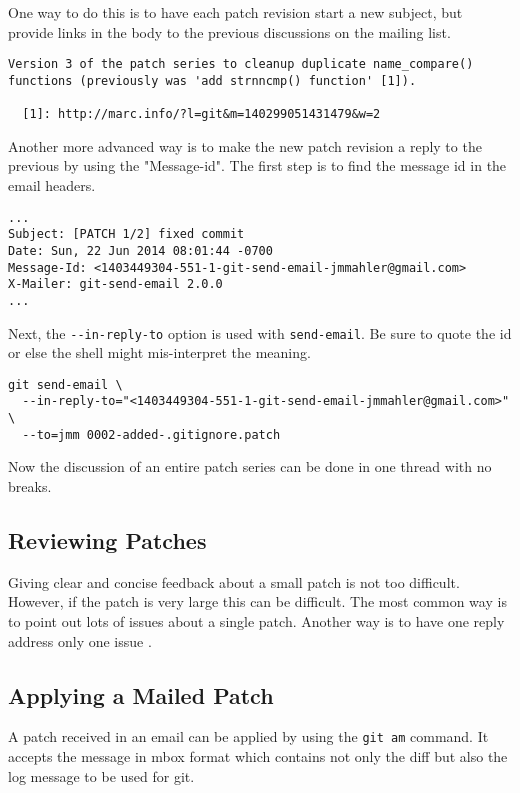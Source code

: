 \documentclass{article}
\begin{document}
One way to do this is to have each patch revision start a new subject,
but provide links in the body to the previous discussions on the mailing list.

\begin{verbatim}
Version 3 of the patch series to cleanup duplicate name_compare()
functions (previously was 'add strnncmp() function' [1]).  
    
  [1]: http://marc.info/?l=git&m=140299051431479&w=2
\end{verbatim}

Another more advanced way is to make the new patch revision a reply to the
previous by using the "Message-id".  The first step is to find the
message id in the email headers.

\begin{verbatim}
...
Subject: [PATCH 1/2] fixed commit
Date: Sun, 22 Jun 2014 08:01:44 -0700
Message-Id: <1403449304-551-1-git-send-email-jmmahler@gmail.com>
X-Mailer: git-send-email 2.0.0
...
\end{verbatim}

Next, the \verb+--in-reply-to+ option is used with \verb+send-email+.  Be sure to
quote the id or else the shell might mis-interpret the meaning.

\begin{verbatim}
git send-email \
  --in-reply-to="<1403449304-551-1-git-send-email-jmmahler@gmail.com>" \
  --to=jmm 0002-added-.gitignore.patch
\end{verbatim}

Now the discussion of an entire patch series can be done in one thread
with no breaks.

\subsection{Reviewing Patches}

Giving clear and concise feedback about a small patch is not too
difficult.  However, if the patch is very large this can be difficult.
The most common way is to point out lots of issues about a single patch.
Another way is to have one reply address only one issue \autocite{onereply}.

\subsection{Applying a Mailed Patch}

A patch received in an email can be applied by using the \verb+git am+ command.
It accepts the message in mbox format which contains not only the diff
but also the log message to be used for git.
\end{document}
